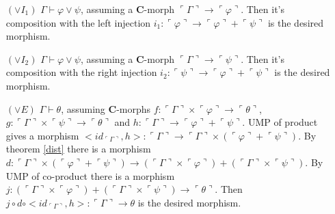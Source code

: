 \documentclass[a4paper,12pt]{paper}
\newcommand{\val}[1]{\ulcorner #1 \urcorner}
\begin{document}
\begin{itemize}
\item[$(\lor I_1)$] $\Gamma \vdash \varphi \lor \psi$, assuming a $\mathbf{C}$-morph $\val \Gamma \longrightarrow \val \varphi$. Then it's composition with the left injection $i_1 : \val \varphi \longrightarrow \val \varphi +‌\val \psi$ is the desired morphism.\\
\item[$(\lor I_2)$] $\Gamma \vdash \varphi \lor \psi$, assuming a $\mathbf{C}$-morph $\val \Gamma \longrightarrow \val \psi$. Then it's composition with the right injection $i_2 : \val \psi \longrightarrow \val \varphi +‌\val \psi$ is the desired morphism.\\
\item[$(\lor E)$] $\Gamma \vdash \theta$, assuming $\mathbf{C}$-morphs $f ‌:\val \Gamma \times \val \varphi \longrightarrow \val \theta$, $g : \val \Gamma \times \val \psi \longrightarrow \val \theta$ and $h : \val \Gamma \longrightarrow \val \varphi + \val \psi$. UMP of product gives a morphism $<id_{\val\Gamma}, h> :‌\val \Gamma \longrightarrow \val \Gamma \times (\val \varphi +‌\val \psi)$. By theorem \ref{dist} there is a morphism $d : \val \Gamma \times (\val \varphi +‌\val \psi) \longrightarrow (\val \Gamma \times \val \varphi) +‌(\val \Gamma \times \val \psi)$. By UMP of co-product there is a morphism $j :‌(\val \Gamma \times \val \varphi) +‌(\val \Gamma \times \val \psi) \longrightarrow \val \theta$. Then $j \circ d \circ <id_{\val\Gamma}, h> :‌\val \Gamma \longrightarrow \theta$ is the desired morphism.
\end{itemize}
\end{document}
